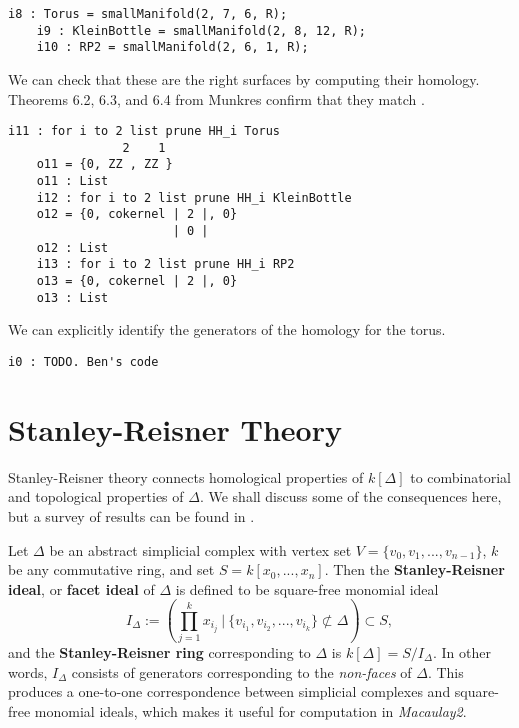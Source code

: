 \documentclass[12pt,leqno]{amsart}
\theoremstyle{definition}
\newenvironment{example}
{\pushQED{\qed}\renewcommand{\qedsymbol}{$\diamond$}\examplex}
{\popQED\endexamplex}
\begin{document}
\begin{example}\label{example of using database}
  \begin{lstlisting}[basicstyle={\ttfamily \scriptsize}, xleftmargin=-23pt]
    i8 : Torus = smallManifold(2, 7, 6, R);
    i9 : KleinBottle = smallManifold(2, 8, 12, R);
    i10 : RP2 = smallManifold(2, 6, 1, R);
  \end{lstlisting}
  We can check that these are the right surfaces by computing their homology. Theorems 6.2, 6.3, and 6.4 from Munkres confirm that they match \cite{Munkres}.
  \begin{lstlisting}[basicstyle={\ttfamily \scriptsize}, xleftmargin=-23pt]
    i11 : for i to 2 list prune HH_i Torus
                2    1
    o11 = {0, ZZ , ZZ }
    o11 : List
    i12 : for i to 2 list prune HH_i KleinBottle
    o12 = {0, cokernel | 2 |, 0}
                       | 0 |
    o12 : List
    i13 : for i to 2 list prune HH_i RP2
    o13 = {0, cokernel | 2 |, 0}
    o13 : List
\end{lstlisting}
  We can explicitly identify the generators of the homology for the torus.
  \begin{lstlisting}[basicstyle={\ttfamily \scriptsize}, xleftmargin=-23pt]
    i0 : TODO. Ben's code
  \end{lstlisting}
\end{example}

\section{Stanley-Reisner Theory}

\noindent
Stanley-Reisner theory connects homological properties of $k[\Delta]$ to combinatorial and topological properties of $\Delta$. We shall discuss some of the consequences here, but a survey of results can be found in \cites{BH, Stanley, MS}.

Let $\Delta$ be an abstract simplicial complex with vertex set $V = \{v_0,v_1,...,v_{n-1}\}$, $k$ be any commutative ring, and set $S = k[x_0,...,x_n]$. Then the \textbf{Stanley-Reisner ideal}, or \textbf{facet ideal} of $\Delta$ is defined to be square-free monomial ideal
%
\begin{displaymath}
  I_\Delta := \left( \prod_{j=1}^k x_{i_j} \ \bigg\vert \ \{ v_{i_1},v_{i_2},...,v_{i_k} \} \not \subset \Delta \right) \subset S,
\end{displaymath}
%
and the \textbf{Stanley-Reisner ring} corresponding to $\Delta$ is $k[\Delta] = S/I_\Delta$. In other words, $I_\Delta$ consists of generators corresponding to the \textit{non-faces} of $\Delta$. This produces a one-to-one correspondence between simplicial complexes and square-free monomial ideals, which makes it useful for computation in \textit{Macaulay2}.
\end{document}
